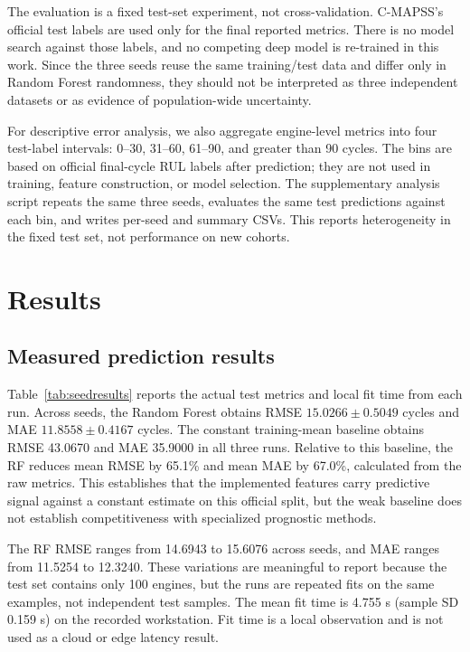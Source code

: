 ﻿\documentclass[conference]{IEEEtran}
\begin{document}
The evaluation is a fixed test-set experiment, not cross-validation. C-MAPSS's official test labels are used only for the final reported metrics. There is no model search against those labels, and no competing deep model is re-trained in this work. Since the three seeds reuse the same training/test data and differ only in Random Forest randomness, they should not be interpreted as three independent datasets or as evidence of population-wide uncertainty.

For descriptive error analysis, we also aggregate engine-level metrics into four test-label intervals: 0--30, 31--60, 61--90, and greater than 90 cycles. The bins are based on official final-cycle RUL labels after prediction; they are not used in training, feature construction, or model selection. The supplementary analysis script repeats the same three seeds, evaluates the same test predictions against each bin, and writes per-seed and summary CSVs. This reports heterogeneity in the fixed test set, not performance on new cohorts.

\section{Results}
\subsection{Measured prediction results}
Table~\ref{tab:seedresults} reports the actual test metrics and local fit time from each run. Across seeds, the Random Forest obtains RMSE $15.0266\pm0.5049$ cycles and MAE $11.8558\pm0.4167$ cycles. The constant training-mean baseline obtains RMSE 43.0670 and MAE 35.9000 in all three runs. Relative to this baseline, the RF reduces mean RMSE by 65.1\% and mean MAE by 67.0\%, calculated from the raw metrics. This establishes that the implemented features carry predictive signal against a constant estimate on this official split, but the weak baseline does not establish competitiveness with specialized prognostic methods.

The RF RMSE ranges from 14.6943 to 15.6076 across seeds, and MAE ranges from 11.5254 to 12.3240. These variations are meaningful to report because the test set contains only 100 engines, but the runs are repeated fits on the same examples, not independent test samples. The mean fit time is 4.755 s (sample SD 0.159 s) on the recorded workstation. Fit time is a local observation and is not used as a cloud or edge latency result.
\end{document}
